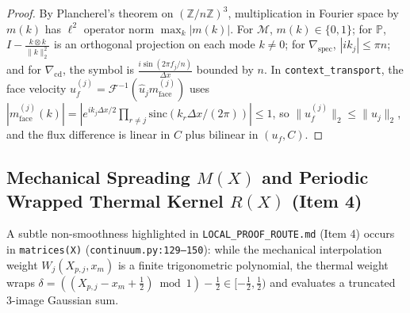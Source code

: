 \documentclass[11pt,a4paper]{article}
\theoremstyle{definition}
\begin{document}
\begin{proof}
By Plancherel's theorem on $(\mathbb{Z}/n\mathbb{Z})^3$, multiplication in Fourier space by $m(k)$ has $\ell^2$ operator norm $\max_k |m(k)|$. For $\mathcal{M}$, $m(k) \in \{0, 1\}$; for $\mathbb{P}$, $I - \frac{k \otimes k}{\|k\|_2^2}$ is an orthogonal projection on each mode $k \ne 0$; for $\nabla_{\mathrm{spec}}$, $|i k_j| \le \pi n$; and for $\nabla_{\mathrm{cd}}$, the symbol is $\frac{i\sin(2\pi f_j/n)}{\Delta x}$ bounded by $n$. In \texttt{context\_transport}, the face velocity $u_f^{(j)} = \mathcal{F}^{-1}(\widehat{u}_j m_{\mathrm{face}}^{(j)})$ uses $|m_{\mathrm{face}}^{(j)}(k)| = |e^{i k_j \Delta x/2}\prod_{r\ne j}\mathrm{sinc}(k_r \Delta x/(2\pi))| \le 1$, so $\|u_f^{(j)}\|_2 \le \|u_j\|_2$, and the flux difference is linear in $C$ plus bilinear in $(u_f, C)$.
\end{proof}

\subsection{\texorpdfstring{Mechanical Spreading $M(X)$ and Periodic Wrapped Thermal Kernel $R(X)$ (Item 4)}{Mechanical Spreading M(X) and Periodic Wrapped Thermal Kernel R(X) (Item 4)}}

A subtle non-smoothness highlighted in \texttt{LOCAL\_PROOF\_ROUTE.md} (Item 4) occurs in \texttt{matrices(X)} (\texttt{continuum.py:129--150}): while the mechanical interpolation weight $W_j(X_{p,j}, x_m)$ is a finite trigonometric polynomial, the thermal weight wraps $\delta = ((X_{p,j} - x_m + \frac{1}{2}) \bmod 1) - \frac{1}{2} \in [-\frac{1}{2}, \frac{1}{2})$ and evaluates a truncated 3-image Gaussian sum.
\end{document}
